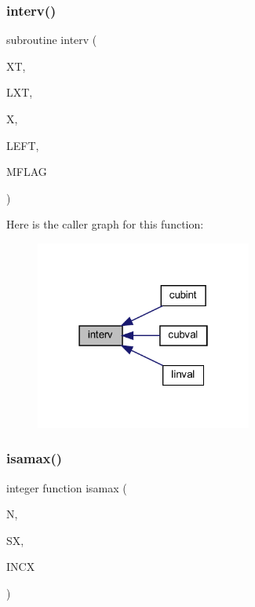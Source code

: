 \subsubsection{\texorpdfstring{interv()}{interv()}}
{\footnotesize\ttfamily subroutine interv (\begin{DoxyParamCaption}\item[{real, dimension(lxt)}]{XT,  }\item[{integer}]{L\+XT,  }\item[{real}]{X,  }\item[{integer}]{L\+E\+FT,  }\item[{integer}]{M\+F\+L\+AG }\end{DoxyParamCaption})}

Here is the caller graph for this function\+:
\nopagebreak
\begin{figure}[H]
\begin{center}
\leavevmode
\includegraphics[width=202pt]{Marco_8f90_ab3d44a77ee1868f9a09dcac7e6bfcdce_icgraph}
\end{center}
\end{figure}
\mbox{\label{Marco_8f90_a16c36ed9a25ca6e68931c4a00d2778e5}} 
\subsubsection{\texorpdfstring{isamax()}{isamax()}}
{\footnotesize\ttfamily integer function isamax (\begin{DoxyParamCaption}\item[{integer}]{N,  }\item[{complex, dimension(n)}]{SX,  }\item[{integer}]{I\+N\+CX }\end{DoxyParamCaption})}


